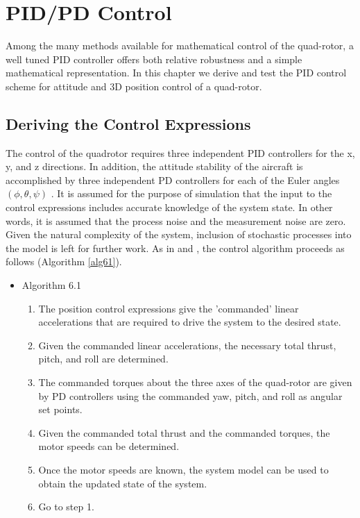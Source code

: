 
\chapter{PID/PD Control} %

\label{Chapter6} %


Among the many methods available for mathematical control of the quad-rotor, a well tuned PID controller offers both relative robustness and a simple mathematical representation. In this chapter we derive and test the PID control scheme for attitude and 3D position control of a quad-rotor.  


\section{Deriving the Control Expressions}

The control of the quadrotor requires three independent PID controllers for the x, y, and z directions. In addition, the attitude stability of the aircraft is accomplished by three independent PD controllers for each of the Euler angles $(\phi,\theta,\psi)$ . It is assumed for the purpose of simulation that the input to the control expressions includes accurate knowledge of the system state. In other words, it is assumed that the process noise and the measurement noise are zero. Given the natural complexity of the system, inclusion of stochastic processes into the model is left for further work. As in \cite{Luukkonen} and \cite{bouabdallah2004pid}, the control algorithm proceeds as follows (Algorithm \ref{alg61}).

\begin{itemize}
\label{alg61}
\item Algorithm 6.1
    \begin{enumerate}
    \item The position control expressions give the 'commanded' linear accelerations that are required to drive the system to the desired state.
    \item Given the commanded linear accelerations, the necessary total thrust, pitch, and roll are determined.
    \item The commanded torques about the three axes of the quad-rotor are given by PD controllers using the commanded yaw, pitch, and roll as angular set points.
    \item Given the commanded total thrust and the commanded torques, the motor speeds can be determined.
    \item Once the motor speeds are known, the system model can be used to obtain the updated state of the system.
    \item Go to step 1.
    \end{enumerate}
\end{itemize}


